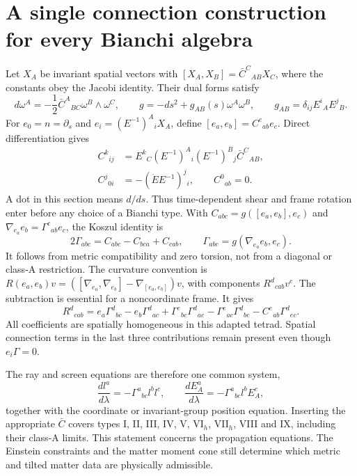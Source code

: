 \section{A single connection construction for every Bianchi algebra}
\label{vii:all_bianchi}
Let $X_A$ be invariant spatial vectors with $[X_A,X_B]=\bar C^C{}_{AB}X_C$, where the constants obey the Jacobi identity. Their dual forms satisfy
\begin{equation}\label{vii:coframe}
d\omega^A=-\frac12\bar C^A{}_{BC}\omega^B\wedge\omega^C,
\qquad g=-ds^2+g_{AB}(s)\omega^A\omega^B,
\qquad g_{AB}=\delta_{ij}E^i{}_AE^j{}_B.
\end{equation}
For $e_0=n=\partial_s$ and $e_i=(E^{-1})^A{}_iX_A$, define $[e_a,e_b]=C^c{}_{ab}e_c$. Direct differentiation gives
\begin{align}
C^k{}_{ij}&=E^k{}_C(E^{-1})^A{}_i(E^{-1})^B{}_j\bar C^C{}_{AB},\label{vii:spatial_structure}\\
C^j{}_{0i}&=-(\dot E E^{-1})^j{}_i,\qquad C^0{}_{ab}=0.\label{vii:temporal_structure}
\end{align}
A dot in this section means $d/ds$. Thus time-dependent shear and frame rotation enter before any choice of a Bianchi type. With $C_{abc}=g([e_a,e_b],e_c)$ and $\nabla_{e_a}e_b=\Gamma^c{}_{ab}e_c$, the Koszul identity is
\begin{equation}\label{vii:koszul}
2\Gamma_{abc}=C_{abc}-C_{bca}+C_{cab},\qquad
\Gamma_{abc}=g(\nabla_{e_a}e_b,e_c).
\end{equation}
It follows from metric compatibility and zero torsion, not from a diagonal or class-A restriction. The curvature convention is $R(e_a,e_b)v=([\nabla_{e_a},\nabla_{e_b}]-\nabla_{[e_a,e_b]})v$, with components $R^d{}_{cab}v^c$. The subtraction is essential for a noncoordinate frame. It gives
\begin{equation}\label{vii:frame_curvature}
R^d{}_{cab}=e_a\Gamma^d{}_{bc}-e_b\Gamma^d{}_{ac}
+\Gamma^e{}_{bc}\Gamma^d{}_{ae}-\Gamma^e{}_{ac}\Gamma^d{}_{be}
-C^e{}_{ab}\Gamma^d{}_{ec}.
\end{equation}
All coefficients are spatially homogeneous in this adapted tetrad. Spatial connection terms in the last three contributions remain present even though $e_i\Gamma=0$.

The ray and screen equations are therefore one common system,
\begin{equation}\label{vii:frame_ray}
\frac{dl^a}{d\lambda}=-\Gamma^a{}_{bc}l^bl^c,\qquad
\frac{dE_A^a}{d\lambda}=-\Gamma^a{}_{bc}l^bE_A^c,
\end{equation}
together with the coordinate or invariant-group position equation. Inserting the appropriate $\bar C$ covers types I, II, III, IV, V, VI$_h$, VII$_h$, VIII and IX, including their class-A limits. This statement concerns the propagation equations. The Einstein constraints and the matter moment cone still determine which metric and tilted matter data are physically admissible.

